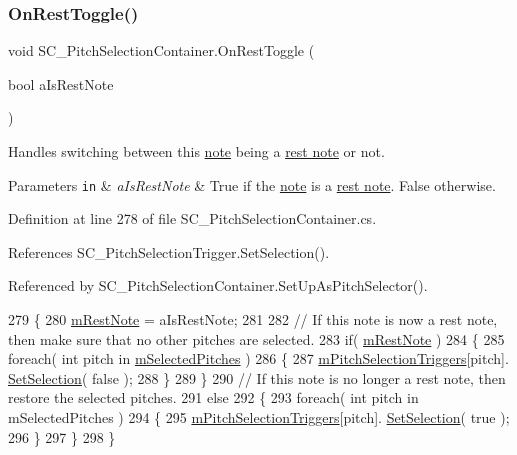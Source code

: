 \subsubsection{\texorpdfstring{On\+Rest\+Toggle()}{OnRestToggle()}}
{\footnotesize\ttfamily void S\+C\+\_\+\+Pitch\+Selection\+Container.\+On\+Rest\+Toggle (\begin{DoxyParamCaption}\item[{bool}]{a\+Is\+Rest\+Note }\end{DoxyParamCaption})}



Handles switching between this \hyperlink{group___music_structs_struct_music_1_1_combined_note}{note} being a \hyperlink{group___doc_s_c___p_s_c_DocSC_PSCRest}{rest note} or not. 


\begin{DoxyParams}[1]{Parameters}
\mbox{\tt in}  & {\em a\+Is\+Rest\+Note} & True if the \hyperlink{group___music_structs_struct_music_1_1_combined_note}{note} is a \hyperlink{group___doc_s_c___p_s_c_DocSC_PSCRest}{rest note}. False otherwise. \\
\hline
\end{DoxyParams}


Definition at line 278 of file S\+C\+\_\+\+Pitch\+Selection\+Container.\+cs.



References S\+C\+\_\+\+Pitch\+Selection\+Trigger.\+Set\+Selection().



Referenced by S\+C\+\_\+\+Pitch\+Selection\+Container.\+Set\+Up\+As\+Pitch\+Selector().


\begin{DoxyCode}
279     \{
280         \hyperlink{group___s_c___p_s_c_priv_var_ga6eec175f775c35e2d0eb51dfe6def49f}{mRestNote} = aIsRestNote;
281 
282         \textcolor{comment}{// If this note is now a rest note, then make sure that no other pitches are selected.}
283         \textcolor{keywordflow}{if}( \hyperlink{group___s_c___p_s_c_priv_var_ga6eec175f775c35e2d0eb51dfe6def49f}{mRestNote} )
284         \{
285             \textcolor{keywordflow}{foreach}( \textcolor{keywordtype}{int} pitch \textcolor{keywordflow}{in} \hyperlink{group___s_c___p_s_c_priv_var_ga5a8a5c31158f6af7f0c17d4fd03c5641}{mSelectedPitches} )
286             \{
287                 \hyperlink{group___s_c___p_s_c_priv_var_ga8431846d376b98bc6de5a872cce2c596}{mPitchSelectionTriggers}[pitch].
      \hyperlink{group___s_c___p_s_t_pub_func_ga267db9aed38ba33ad44c26c84a1757df}{SetSelection}( \textcolor{keyword}{false} );
288             \}
289         \}
290         \textcolor{comment}{// If this note is no longer a rest note, then restore the selected pitches.}
291         \textcolor{keywordflow}{else}
292         \{
293             \textcolor{keywordflow}{foreach}( \textcolor{keywordtype}{int} pitch \textcolor{keywordflow}{in} mSelectedPitches )
294             \{
295                 \hyperlink{group___s_c___p_s_c_priv_var_ga8431846d376b98bc6de5a872cce2c596}{mPitchSelectionTriggers}[pitch].
      \hyperlink{group___s_c___p_s_t_pub_func_ga267db9aed38ba33ad44c26c84a1757df}{SetSelection}( \textcolor{keyword}{true} );
296             \}
297         \}
298     \}
\end{DoxyCode}
